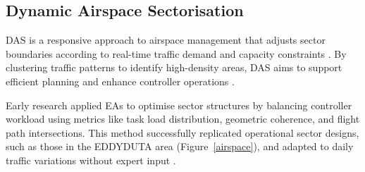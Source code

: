 \subsection{Dynamic Airspace Sectorisation}

\Gls{DAS} is a responsive approach to airspace management that adjusts sector boundaries according to real-time traffic demand and capacity constraints \cite{Zhou_2023}.
By clustering traffic patterns to identify high-density areas, \gls{DAS} aims to support efficient planning and enhance controller operations \cite{Schultz_2018}.


Early research applied \glspl{EA} to optimise sector structures by balancing controller workload using metrics like task load distribution, geometric coherence, and flight path intersections. 
This method successfully replicated operational sector designs, such as those in the EDDYDUTA area (Figure~\ref{airspace}), and adapted to daily traffic variations without expert input \cite{Schultz_2018}.

